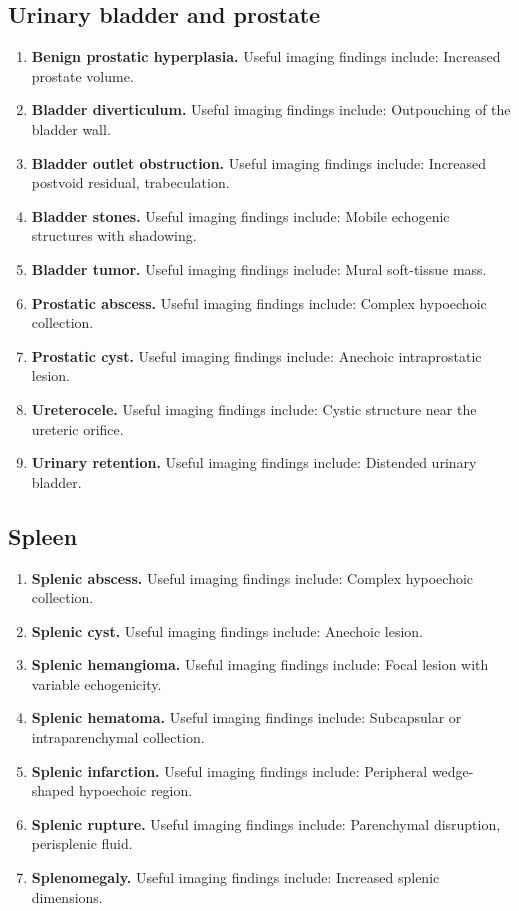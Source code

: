 \subsection{Urinary bladder and prostate}
\begin{enumerate}[leftmargin=*,itemsep=0.45em,topsep=0.4em]
\item \textbf{Benign prostatic hyperplasia.} Useful imaging findings include: Increased prostate volume.
\item \textbf{Bladder diverticulum.} Useful imaging findings include: Outpouching of the bladder wall.
\item \textbf{Bladder outlet obstruction.} Useful imaging findings include: Increased postvoid residual, trabeculation.
\item \textbf{Bladder stones.} Useful imaging findings include: Mobile echogenic structures with shadowing.
\item \textbf{Bladder tumor.} Useful imaging findings include: Mural soft-tissue mass.
\item \textbf{Prostatic abscess.} Useful imaging findings include: Complex hypoechoic collection.
\item \textbf{Prostatic cyst.} Useful imaging findings include: Anechoic intraprostatic lesion.
\item \textbf{Ureterocele.} Useful imaging findings include: Cystic structure near the ureteric orifice.
\item \textbf{Urinary retention.} Useful imaging findings include: Distended urinary bladder.
\end{enumerate}

\subsection{Spleen}
\begin{enumerate}[leftmargin=*,itemsep=0.45em,topsep=0.4em]
\item \textbf{Splenic abscess.} Useful imaging findings include: Complex hypoechoic collection.
\item \textbf{Splenic cyst.} Useful imaging findings include: Anechoic lesion.
\item \textbf{Splenic hemangioma.} Useful imaging findings include: Focal lesion with variable echogenicity.
\item \textbf{Splenic hematoma.} Useful imaging findings include: Subcapsular or intraparenchymal collection.
\item \textbf{Splenic infarction.} Useful imaging findings include: Peripheral wedge-shaped hypoechoic region.
\item \textbf{Splenic rupture.} Useful imaging findings include: Parenchymal disruption, perisplenic fluid.
\item \textbf{Splenomegaly.} Useful imaging findings include: Increased splenic dimensions.
\end{enumerate}

